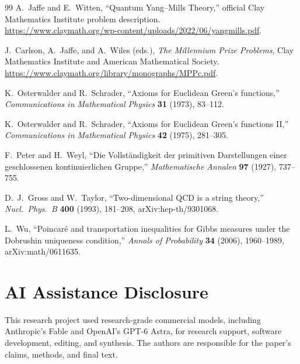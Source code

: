 \documentclass[11pt]{article}
\numberwithin{equation}{section}
\theoremstyle{remark}
\begin{document}
\begin{thebibliography}{99}
A.~Jaffe and E.~Witten,
``Quantum Yang--Mills Theory,''
official Clay Mathematics Institute problem description.\\
\url{https://www.claymath.org/wp-content/uploads/2022/06/yangmills.pdf}.

J.~Carlson, A.~Jaffe, and A.~Wiles (eds.),
\emph{The Millennium Prize Problems},
Clay Mathematics Institute and American Mathematical Society.\\
\url{https://www.claymath.org/library/monographs/MPPc.pdf}.

K.~Osterwalder and R.~Schrader,
``Axioms for Euclidean Green's functions,''
\emph{Communications in Mathematical Physics} \textbf{31} (1973), 83--112.

K.~Osterwalder and R.~Schrader,
``Axioms for Euclidean Green's functions II,''
\emph{Communications in Mathematical Physics} \textbf{42} (1975), 281--305.

F.~Peter and H.~Weyl,
``Die Vollst\"andigkeit der primitiven Darstellungen einer geschlossenen kontinuierlichen Gruppe,''
\emph{Mathematische Annalen} \textbf{97} (1927), 737--755.

D.~J.~Gross and W.~Taylor,
``Two-dimensional QCD is a string theory,''
\emph{Nucl.\ Phys.\ B} \textbf{400} (1993), 181--208,
arXiv:hep-th/9301068.

L.~Wu,
``Poincar\'e and transportation inequalities for Gibbs measures under the Dobrushin uniqueness condition,''
\emph{Annals of Probability} \textbf{34} (2006), 1960--1989,
arXiv:math/0611635.

\end{thebibliography}

\section*{AI Assistance Disclosure}
This research project used research-grade commercial models, including
Anthropic's Fable and OpenAI's GPT-6 Astra, for research support, software
development, editing, and synthesis. The authors are responsible for the
paper's claims, methods, and final text.
\end{document}
